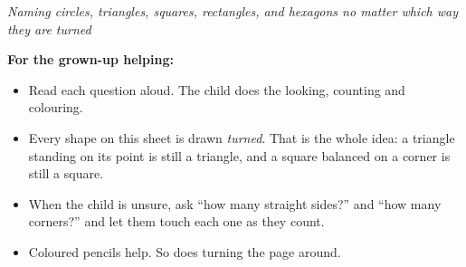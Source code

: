 \documentclass[12pt]{article}
\begin{document}

\begin{center}\small\textit{Naming circles, triangles, squares, rectangles, and hexagons no
matter which way they are turned}\end{center}

\noindent\small\textbf{For the grown-up helping:}
\begin{itemize}[label={$\bullet$}, leftmargin=1.1cm, itemsep=1pt, topsep=2pt]
  \item Read each question aloud. The child does the looking, counting and colouring.
  \item Every shape on this sheet is drawn \emph{turned}. That is the whole idea: a
        triangle standing on its point is still a triangle, and a square balanced on a
        corner is still a square.
  \item When the child is unsure, ask ``how many straight sides?'' and ``how many
        corners?'' and let them touch each one as they count.
  \item Coloured pencils help. So does turning the page around.
\end{itemize}
\normalsize

\begin{center}
\end{center}
\end{document}
